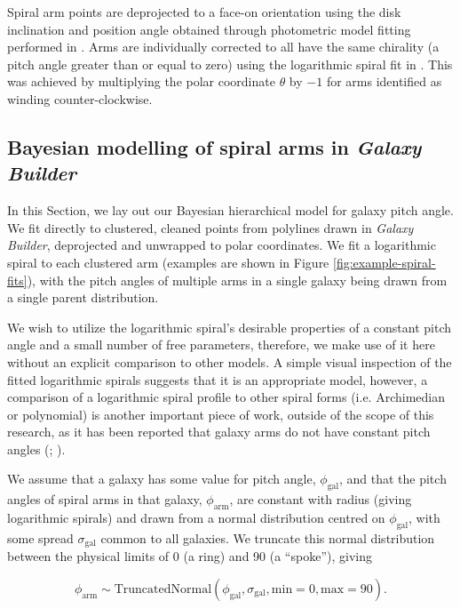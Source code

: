 Spiral arm points are deprojected to a face-on orientation using the disk inclination and position angle obtained through photometric model fitting performed in \citet{2020arXiv200610450L}. Arms are individually corrected to all have the same chirality (a pitch angle greater than or equal to zero) using the logarithmic spiral fit in \citet{2020arXiv200610450L}. This was achieved by multiplying the polar coordinate $\theta$ by $-1$ for arms identified as winding counter-clockwise.

\subsection{Bayesian modelling of spiral arms in \textit{Galaxy Builder}}
\label{section:bhsm-model}
In this Section, we lay out our Bayesian hierarchical model for galaxy pitch angle. We fit directly to clustered, cleaned points from polylines drawn in \textit{Galaxy Builder}, deprojected and unwrapped to polar coordinates. We fit a logarithmic spiral to each clustered arm (examples are shown in Figure \ref{fig:example-spiral-fits}), with the pitch angles of multiple arms in a single galaxy being drawn from a single parent distribution.

We wish to utilize the logarithmic spiral's desirable properties of a constant pitch angle and a small number of free parameters, therefore, we make use of it here without an explicit comparison to other models. A simple visual inspection of the fitted logarithmic spirals suggests that it is an appropriate model, however, a comparison of a logarithmic spiral profile to other spiral forms (i.e. Archimedian or polynomial) is another important piece of work, outside of the scope of this research, as it has been reported that galaxy arms do not have constant pitch angles (\citealt{1981AJ.....86.1847K}; \citealt{2009MNRAS.397..164R}).

We assume that a galaxy has some value for pitch angle, $\phi_\mathrm{gal}$, and that the pitch angles of spiral arms in that galaxy, $\phi_\mathrm{arm}$, are constant with radius (giving logarithmic spirals) and drawn from a normal distribution centred on $\phi_\mathrm{gal}$, with some spread $\sigma_\mathrm{gal}$ common to all galaxies. We truncate this normal distribution between the physical limits of {0\degree} (a ring) and {90\degree} (a ``spoke''), giving

\begin{equation}
\phi_\mathrm{arm} \sim \mathrm{TruncatedNormal}(\phi_\mathrm{gal}, \sigma_\mathrm{gal}, \mathrm{min}=0, \mathrm{max}=90).
\end{equation}

